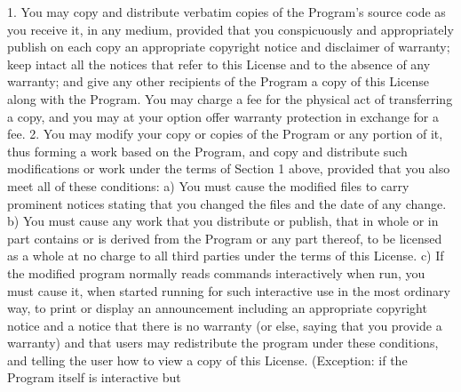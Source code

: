 \begin{DoxyCodeInclude}
  1. You may copy and distribute verbatim copies of the Program\textcolor{stringliteral}{'s}
\textcolor{stringliteral}{source code as you receive it, in any medium, provided that you}
\textcolor{stringliteral}{conspicuously and appropriately publish on each copy an appropriate}
\textcolor{stringliteral}{copyright notice and disclaimer of warranty; keep intact all the}
\textcolor{stringliteral}{notices that refer to this License and to the absence of any warranty;}
\textcolor{stringliteral}{and give any other recipients of the Program a copy of this License}
\textcolor{stringliteral}{along with the Program.}
\textcolor{stringliteral}{}
\textcolor{stringliteral}{You may charge a fee for the physical act of transferring a copy, and}
\textcolor{stringliteral}{you may at your option offer warranty protection in exchange for a fee.}
\textcolor{stringliteral}{}
\textcolor{stringliteral}{  2. You may modify your copy or copies of the Program or any portion}
\textcolor{stringliteral}{of it, thus forming a work based on the Program, and copy and}
\textcolor{stringliteral}{distribute such modifications or work under the terms of Section 1}
\textcolor{stringliteral}{above, provided that you also meet all of these conditions:}
\textcolor{stringliteral}{}
\textcolor{stringliteral}{    a) You must cause the modified files to carry prominent notices}
\textcolor{stringliteral}{    stating that you changed the files and the date of any change.}
\textcolor{stringliteral}{}
\textcolor{stringliteral}{    b) You must cause any work that you distribute or publish, that in}
\textcolor{stringliteral}{    whole or in part contains or is derived from the Program or any}
\textcolor{stringliteral}{    part thereof, to be licensed as a whole at no charge to all third}
\textcolor{stringliteral}{    parties under the terms of this License.}
\textcolor{stringliteral}{}
\textcolor{stringliteral}{    c) If the modified program normally reads commands interactively}
\textcolor{stringliteral}{    when run, you must cause it, when started running for such}
\textcolor{stringliteral}{    interactive use in the most ordinary way, to print or display an}
\textcolor{stringliteral}{    announcement including an appropriate copyright notice and a}
\textcolor{stringliteral}{    notice that there is no warranty (or else, saying that you provide}
\textcolor{stringliteral}{    a warranty) and that users may redistribute the program under}
\textcolor{stringliteral}{    these conditions, and telling the user how to view a copy of this}
\textcolor{stringliteral}{    License.  (Exception: if the Program itself is interactive but}

\end{DoxyCodeInclude}
